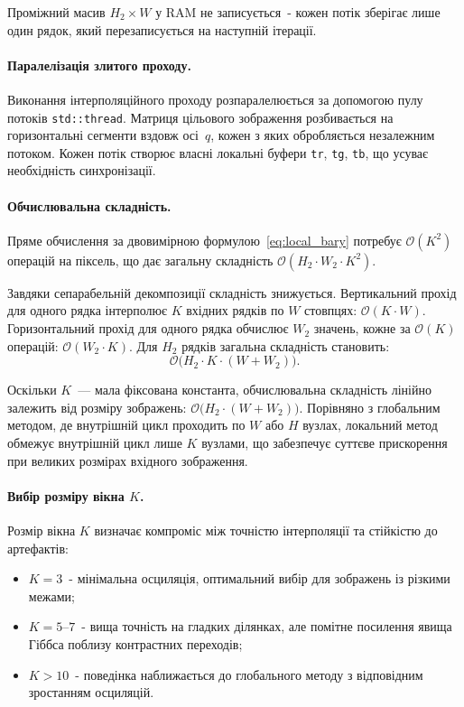 Проміжний масив $H_2 \times W$ у RAM не записується~- кожен
потік зберігає лише один рядок, який перезаписується на наступній
ітерації.

\paragraph{Паралелізація злитого проходу.}
Виконання інтерполяційного проходу розпаралелюється за допомогою пулу
потоків \texttt{std::thread}. Матриця цільового зображення розбивається
на горизонтальні сегменти вздовж осі~$q$, кожен з яких обробляється
незалежним потоком. Кожен потік створює власні локальні буфери
\texttt{tr}, \texttt{tg}, \texttt{tb}, що усуває необхідність
синхронізації.

\paragraph{Обчислювальна складність.}
Пряме обчислення за двовимірною формулою~\eqref{eq:local_bary}
потребує $\mathcal{O}(K^2)$ операцій на піксель, що дає загальну
складність $\mathcal{O}(H_2 \cdot W_2 \cdot K^2)$.

Завдяки сепарабельній декомпозиції складність знижується. Вертикальний
прохід для одного рядка інтерполює $K$ вхідних рядків по $W$ стовпцях:
$\mathcal{O}(K \cdot W)$. Горизонтальний прохід для одного рядка
обчислює $W_2$ значень, кожне за $\mathcal{O}(K)$ операцій:
$\mathcal{O}(W_2 \cdot K)$. Для $H_2$ рядків загальна складність
становить:
\begin{equation}
	\mathcal{O}\bigl(H_2 \cdot K \cdot (W + W_2)\bigr).
\end{equation}

Оскільки $K$~--- мала фіксована константа, обчислювальна складність
лінійно залежить від розміру зображень:
$\mathcal{O}\bigl(H_2 \cdot (W + W_2)\bigr)$. Порівняно з глобальним
методом, де внутрішній цикл проходить по $W$ або $H$ вузлах,
локальний метод обмежує внутрішній цикл лише $K$ вузлами, що забезпечує
суттєве прискорення при великих розмірах вхідного зображення.

\paragraph{Вибір розміру вікна $K$.}
Розмір вікна $K$ визначає компроміс між точністю інтерполяції та
стійкістю до артефактів:
\begin{itemize}
	\item $K = 3$~- мінімальна осциляція,
	оптимальний вибір для зображень із різкими межами;
	\item $K = 5\text{--}7$~- вища точність на гладких ділянках, але
	помітне посилення явища Гіббса поблизу контрастних переходів;
	\item $K > 10$~- поведінка наближається до глобального методу з
	відповідним зростанням осциляцій.
\end{itemize}